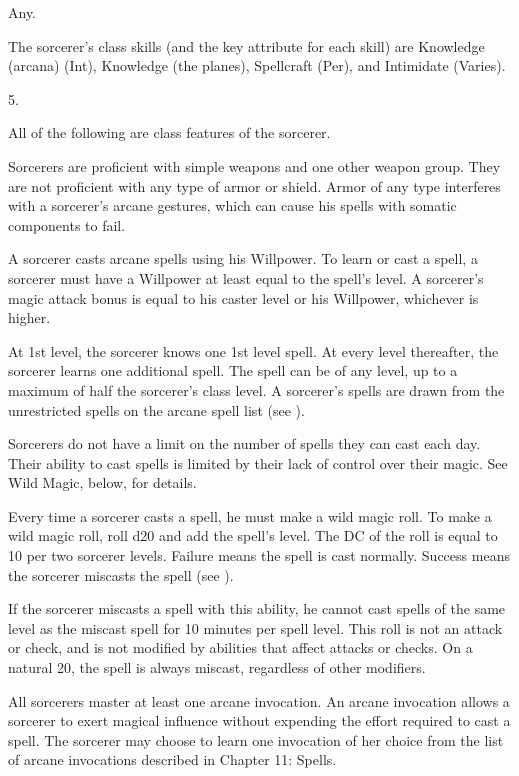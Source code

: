  Any.

The sorcerer's class skills (and the key attribute for each skill) are Knowledge (arcana) (Int), Knowledge (the planes), Spellcraft (Per), and Intimidate (Varies).

5.

All of the following are class features of the sorcerer.

Sorcerers are proficient with simple weapons  and one other weapon group.
They are not proficient with any type of armor or shield.
Armor of any type interferes with a sorcerer's arcane gestures, which can cause his spells with somatic components to fail.

A sorcerer casts arcane spells using his Willpower.
To learn or cast a spell, a sorcerer must have a Willpower at least equal to the spell's level.
A sorcerer's magic attack bonus is equal to his caster level or his Willpower, whichever is higher.

At 1st level, the sorcerer knows one 1st level spell.
At every level thereafter, the sorcerer learns one additional spell.
The spell can be of any level, up to a maximum of half the sorcerer's class level.
A sorcerer's spells are drawn from the unrestricted spells on the arcane spell list (see ).

Sorcerers do not have a limit on the number of spells they can cast each day.
Their ability to cast spells is limited by their lack of control over their magic.
See Wild Magic, below, for details.

Every time a sorcerer casts a spell, he must make a wild magic roll.
To make a wild magic roll, roll d20 and add the spell's level.
The DC of the roll is equal to 10  per two sorcerer levels.
Failure means the spell is cast normally.
Success means the sorcerer miscasts the spell (see ).

If the sorcerer miscasts a spell with this ability, he cannot cast spells of the same level as the miscast spell for 10 minutes per spell level.
This roll is not an attack or check, and is not modified by abilities that affect attacks or checks.
On a natural 20, the spell is always miscast, regardless of other modifiers.

All sorcerers master at least one arcane invocation.
An arcane invocation allows a sorcerer to exert magical influence without expending the effort required to cast a spell.
The sorcerer may choose to learn one invocation of her choice from the list of arcane invocations described in Chapter 11: Spells.


